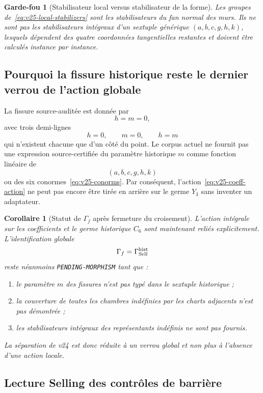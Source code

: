 \documentclass[11pt,a4paper]{article}
\newtheorem{corollary}[theorem]{Corollaire}
\newtheorem{guardrail}[theorem]{Garde-fou}
\newcommand{\certPending}{\texttt{PENDING-MORPHISM}}
\begin{document}
\begin{guardrail}[Stabilisateur local versus stabilisateur de la forme]
Les groupes de~\eqref{eq:v25-local-stabilizers} sont les stabilisateurs du fan normal des murs. Ils ne sont pas les stabilisateurs intégraux d'un sextuple générique $(a,b,c,g,h,k)$, lesquels dépendent des quatre coordonnées tangentielles restantes et doivent être calculés instance par instance.
\end{guardrail}

\subsection{Pourquoi la fissure historique reste le dernier verrou de l'action globale}

La fissure source-auditée est donnée par
\[
 h=m=0,
\]
avec trois demi-lignes
\[
 h=0,
 \qquad
 m=0,
 \qquad
 h=m
\]
qui n'existent chacune que d'un côté du point. Le corpus actuel ne fournit pas une expression source-certifiée du paramètre historique $m$ comme fonction linéaire de
\[
 (a,b,c,g,h,k)
\]
ou des six conormes~\eqref{eq:v25-conorms}. Par conséquent, l'action~\eqref{eq:v25-coeff-action} ne peut pas encore être tirée en arrière sur le germe $Y_3$ sans inventer un adaptateur.

\begin{corollary}[Statut de $\Gamma_f$ après fermeture du croisement]
L'action intégrale sur les coefficients et le germe historique $C_6$ sont maintenant reliés explicitement. L'identification globale
\[
 \Gamma_f=\Gamma_{\rm Sell}^{\rm hist}
\]
reste néanmoins \certPending{} tant que :
\begin{enumerate}[label=\textup{(\roman*)}]
\item le paramètre $m$ des fissures n'est pas typé dans le sextuple historique ;
\item la couverture de toutes les chambres indéfinies par les charts adjacents n'est pas démontrée ;
\item les stabilisateurs intégraux des représentants indéfinis ne sont pas fournis.
\end{enumerate}
La séparation de v24 est donc réduite à un verrou global et non plus à l'absence d'une action locale.
\end{corollary}

\subsection{Lecture Selling des contrôles de barrière}
\end{document}
